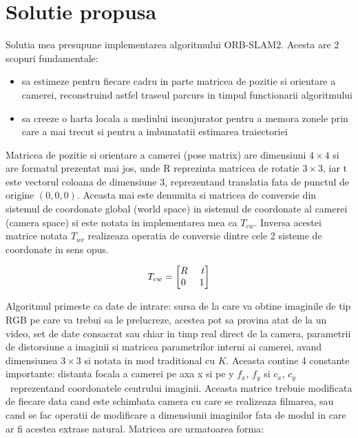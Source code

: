 \documentclass[12pt,a4paper]{report}
\begin{document}
\chapter{Solutie propusa}
Solutia mea presupune implementarea algoritmului ORB-SLAM2. Acesta are 2 scopuri 
fundamentale:
\begin{itemize}
    \item sa estimeze pentru fiecare cadru in parte matricea de pozitie si orientare
a camerei, reconstruind astfel traseul parcurs in timpul functionarii algoritmului  
    \item sa creeze o harta locala a mediului inconjurator pentru a memora zonele
prin care a mai trecut si pentru a imbunatatii estimarea traiectoriei  
\end{itemize}
Matricea de pozitie si orientare a camerei (pose matrix) are dimensiuni $ 4 \times 4 $ si are 
formatul prezentat mai jos, unde R reprezinta matricea de rotatie $ 3 \times 3 $, iar t este
vectorul coloana de dimensiune 3, reprezentand translatia fata de punctul de origine
\( (0, 0, 0)\). Aceasta mai este denumita si matricea de conversie din sistemul de 
coordonate global (world space) in sistemul de coordonate al camerei (camera space) si 
este notata in implementarea mea ca \( T_{cw} \). Inversa acestei matrice notata
\(T_{wc} \) realizeaza operatia de conversie dintre cele 2 sisteme de coordonate 
in sens opus.

\begin{equation}
T_{cw} = 
\begin{bmatrix}
R \hspace{0.5cm} t \\
0 \hspace{0.5cm} 1
\end{bmatrix}
\end{equation}

Algoritmul primeste ca date de intrare: sursa de la care va obtine imaginile de tip
RGB pe care va trebui sa le prelucreze, acestea pot sa provina atat de la un video,
set de date consacrat sau chiar in timp real direct de la camera, parametrii de 
distorsiune a imaginii si matricea parametrilor interni ai camerei, avand dimensiunea 
$ 3 \times 3 $ si notata in mod traditional cu \(K\). Aceasta contine 4 constante importante: 
distanta focala a camerei pe axa x si pe y \(f_x\), \(f_y\) si \(c_x\), \(c_y\) \
reprezentand coordonatele centrului imaginii. Aceasta matrice trebuie modificata de 
fiecare data cand este schimbata camera cu care se realizeaza filmarea, sau cand se 
fac operatii de modificare a dimensiunii imaginilor fata de modul in care ar fi 
acestea extrase natural. Matricea are urmatoarea forma:
   
\end{document}
